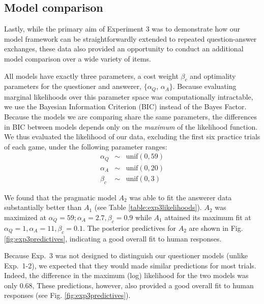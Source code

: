 \documentclass[12pt, floatsintext, jou]{apa6}
\begin{document}
\subsection{Model comparison}

Lastly, while the primary aim of Experiment 3 was to demonstrate how our model framework can be straightforwardly extended to repeated question-answer exchanges, these data also provided an opportunity to conduct an additional model comparison over a wide variety of items.

All models have exactly three parameters, a cost weight $\beta_c$ and optimality parameters for the questioner and answerer, $\{\alpha_Q$, $\alpha_A\}$.
Because evaluating marginal likelihoods over this parameter space was computationally intractable, we use the Bayesian Information Criterion (BIC) instead of the Bayes Factor. 
Because the models we are comparing share the same parameters, the differences in BIC between models depends only on the \emph{maximum} of the likelihood function.
We thus evaluated the likelihood of our data, excluding the first six practice trials of each game, under the following parameter ranges:
$$
\begin{array}{rcl}
\alpha_Q & \sim & \textrm{unif}(0, 59) \\
\alpha_A & \sim & \textrm{unif}(0, 20) \\
\beta_c & \sim & \textrm{unif}(0, 3)
\end{array}
$$

We found that the pragmatic model $A_2$ was able to fit the answerer data substantially better than $A_1$ (see Table \ref{table:exp3likelihoods}).
$A_2$ was maximized at $\alpha_Q = 59; \alpha_A = 2.7, \beta_c = 0.9$ while $A_1$ attained its maximum fit at $\alpha_Q = 1, \alpha_A = 11, \beta_c = 0.1$. 
The posterior predictives for $A_2$ are shown in  Fig. \ref{fig:exp3predictives}, indicating a good overall fit to human responses.

Because Exp.~3 was not designed to distinguish our questioner models (unlike Exp.~1-2), we expected that they would made similar predictions for most trials. 
Indeed, the difference in the maximum (log) likelihood for the two models was only 0.68, 
These predictions, however, also provided a good overall fit to human responses (see Fig. \ref{fig:exp3predictives}).
\end{document}
